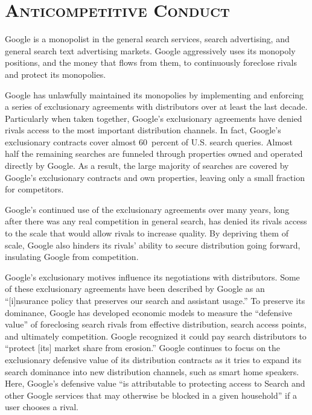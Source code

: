 \documentclass[11pt,b5paper,headings=small]{scrartcl}
\begin{document}

\section{\textsc{Anticompetitive Conduct}}
Google is a monopolist in the general search services, search advertising, and
general search text advertising markets. Google aggressively uses its monopoly positions, and
the money that flows from them, to continuously foreclose rivals and protect its monopolies.


Google has unlawfully maintained its monopolies by implementing and enforcing
a series of exclusionary agreements with distributors over at least the last decade. Particularly
when taken together, Google’s exclusionary agreements have denied rivals access to the most
important distribution channels. In fact, Google’s exclusionary contracts cover almost 60~percent
of U.S. search queries. Almost half the remaining searches are funneled through properties
owned and operated directly by Google. As a result, the large majority of searches are covered
by Google’s exclusionary contracts and own properties, leaving only a small fraction for
competitors.


Google’s continued use of the exclusionary agreements over many years, long
after there was any real competition in general search, has denied its rivals access to the scale
that would allow rivals to increase quality. By depriving them of scale, Google also hinders its
rivals’ ability to secure distribution going forward, insulating Google from competition.


Google’s exclusionary motives influence its negotiations with distributors. Some
of these exclusionary agreements have been described by Google as an “[i]nsurance policy that
preserves our search and assistant usage.” To preserve its dominance, Google has developed
economic models to measure the “defensive value” of foreclosing search rivals from effective
distribution, search access points, and ultimately competition. Google recognized it could pay
search distributors to “protect [its] market share from erosion.” Google continues to focus on the
exclusionary defensive value of its distribution contracts as it tries to expand its search
dominance into new distribution channels, such as smart home speakers. Here, Google’s
defensive value “is attributable to protecting access to Search and other Google services that may
otherwise be blocked in a given household” if a user chooses a rival.
\end{document}
